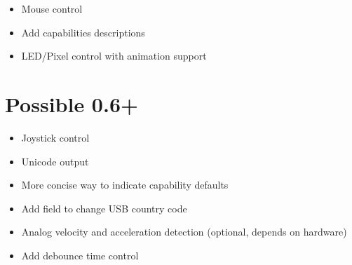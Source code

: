 \documentclass{kiibohd-template}
\begin{document}
\begin{itemize}
\item Mouse control
\item Add capabilities descriptions
\item LED/Pixel control with animation support
\end{itemize}

\section{Possible 0.6+}

\begin{itemize}
\item Joystick control
\item Unicode output
\item More concise way to indicate capability defaults
\item Add field to change USB country code
\item Analog velocity and acceleration detection (optional, depends on hardware)
\item Add debounce time control
\end{itemize}
\end{document}
